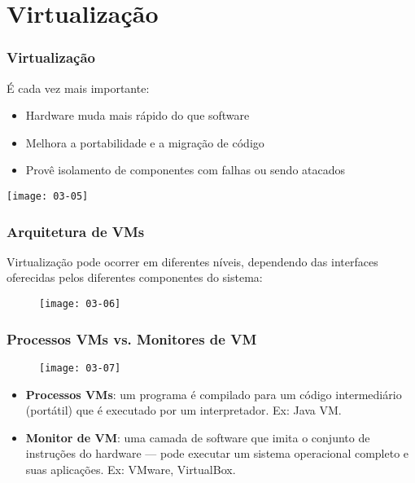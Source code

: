 \documentclass[Ligatures=TeX,table,brazil,svgnames,usetotalslideindicator,compress,10pt]{beamer}
\begin{document}
\section{Virtualização}

\begin{frame}
  \frametitle{Virtualização}
  É cada vez mais importante:
  \begin{itemize}
  \item Hardware \alert{muda mais rápido} do que software
  \item Melhora a \alert{portabilidade} e a migração de código
  \item Provê \alert{isolamento} de componentes com falhas ou sendo atacados
  \end{itemize}

  \texttt{[image: 03-05]}

\end{frame}

\begin{frame}
  \frametitle{Arquitetura de VMs}

  Virtualização pode ocorrer em diferentes níveis, dependendo das \alert{interfaces} oferecidas pelos diferentes componentes do sistema:

  \begin{figure}
    \texttt{[image: 03-06]}
  \end{figure}

\end{frame}

\begin{frame}
  \frametitle{Processos VMs vs. Monitores de VM}
  \begin{figure}
    \centering
    \texttt{[image: 03-07]}
  \end{figure}

  \begin{itemize}
  \item \textbf{Processos VMs}: um programa é compilado para um código intermediário (portátil) que é executado por um interpretador. Ex: Java VM.
  \item  \textbf{Monitor de VM}: uma camada de software que imita o conjunto de instruções do hardware --- pode executar um sistema operacional completo e suas aplicações. Ex: VMware, VirtualBox.
  \end{itemize}

\end{frame}
\end{document}
